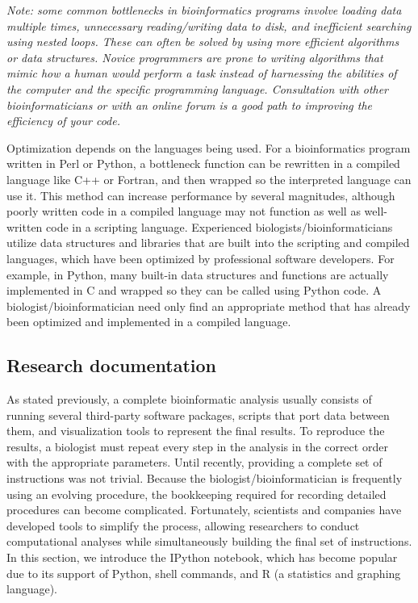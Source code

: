 \documentclass[ChapterTOCs,krantz2]{krantz} %
\begin{document}
\textsl{Note: some common bottlenecks in bioinformatics programs involve 
loading data multiple times, unnecessary reading/writing data to disk, 
and inefficient searching using nested loops.  These can often be solved 
by using more efficient algorithms or data structures.  
Novice programmers are prone to writing algorithms that 
mimic how a human would perform a task instead of 
harnessing the abilities of the computer 
and the specific programming language.  Consultation with other bioinformaticians or with an online forum is a good path to improving the efficiency of your code.}

Optimization depends on the
languages being used. For a bioinformatics program written in Perl or Python, a
bottleneck function can be rewritten in a compiled language like C++ or
Fortran, and then wrapped so the interpreted language can use it.  This method can increase performance by several magnitudes,
although poorly written code in a compiled language may not function as well as
well-written code in a scripting language.  Experienced
biologists/bioinformaticians utilize data structures and libraries that are
built into the scripting and compiled languages, which have been optimized by
professional software developers.  For example, in Python, many built-in data
structures and functions are actually implemented in C and wrapped so
they can be called using Python code.  A biologist/bioinformatician need only 
find an appropriate method that has already
been optimized and implemented in a compiled language.  

\subsection{Research documentation}

As stated previously, a complete bioinformatic analysis usually
consists of running several third-party software packages, scripts that port
data between them, and visualization tools to represent the final
results.  To reproduce the results, a biologist must
repeat every step in the analysis in the correct order with the appropriate
parameters. Until recently, providing a
complete set of instructions was not trivial.
Because the biologist/bioinformatician is frequently using an evolving
procedure, the bookkeeping required for recording detailed procedures
can become complicated.
Fortunately, scientists and companies have developed tools to simplify
the process, allowing researchers to conduct computational analyses while
simultaneously building the final set of instructions. 
In this section, we introduce the IPython notebook, which has become
popular due to its support of Python, shell commands, and R (a
statistics and graphing language). 
 
\end{document}
